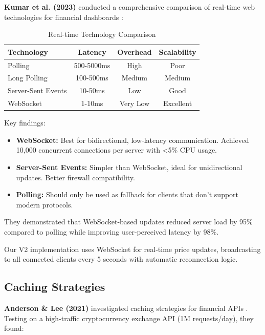 \documentclass[conference]{IEEEtran}
\begin{document}
\textbf{Kumar et al. (2023)} conducted a comprehensive comparison of real-time web technologies for financial dashboards \cite{kumar2023realtime}:

\begin{table}[h]
\centering
\caption{Real-time Technology Comparison}
\begin{tabular}{|l|c|c|c|}
\hline
\textbf{Technology} & \textbf{Latency} & \textbf{Overhead} & \textbf{Scalability} \\
\hline
Polling & 500-5000ms & High & Poor \\
Long Polling & 100-500ms & Medium & Medium \\
Server-Sent Events & 10-50ms & Low & Good \\
WebSocket & 1-10ms & Very Low & Excellent \\
\hline
\end{tabular}
\end{table}

Key findings:
\begin{itemize}
    \item \textbf{WebSocket:} Best for bidirectional, low-latency communication. Achieved 10,000 concurrent connections per server with <5\% CPU usage.
    \item \textbf{Server-Sent Events:} Simpler than WebSocket, ideal for unidirectional updates. Better firewall compatibility.
    \item \textbf{Polling:} Should only be used as fallback for clients that don't support modern protocols.
\end{itemize}

They demonstrated that WebSocket-based updates reduced server load by 95\% compared to polling while improving user-perceived latency by 98\%.

Our V2 implementation uses WebSocket for real-time price updates, broadcasting to all connected clients every 5 seconds with automatic reconnection logic.

\subsection{Caching Strategies}

\textbf{Anderson \& Lee (2021)} investigated caching strategies for financial APIs \cite{anderson2021caching}. Testing on a high-traffic cryptocurrency exchange API (1M requests/day), they found:
\end{document}
